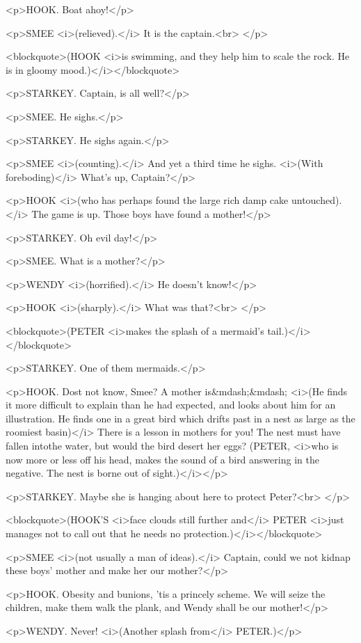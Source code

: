<p>HOOK. Boat ahoy!</p>

<p>SMEE <i>(relieved).</i> It is the captain.<br>
</p>

<blockquote>(HOOK <i>is swimming, and they help him to scale the
rock. He is in gloomy mood.)</i></blockquote>

<p>STARKEY. Captain, is all well?</p>

<p>SMEE. He sighs.</p>

<p>STARKEY. He sighs again.</p>

<p>SMEE <i>(counting).</i> And yet a third time he sighs. <i>(With
foreboding)</i> What's up, Captain?</p>

<p>HOOK <i>(who has perhaps found the large rich damp cake
untouched).</i> The game is up. Those boys have found a mother!</p>

<p>STARKEY. Oh evil day!</p>

<p>SMEE. What is a mother?</p>

<p>WENDY <i>(horrified).</i> He doesn't know!</p>

<p>HOOK <i>(sharply).</i> What was that?<br>
</p>

<blockquote>(PETER <i>makes the splash of a mermaid's
tail.)</i></blockquote>

<p>STARKEY. One of them mermaids.</p>

<p>HOOK. Dost not know, Smee? A mother is&mdash;&mdash; <i>(He finds
it more difficult to explain than he had expected, and looks about
him for an illustration. He finds one in a great bird which drifts
past in a nest as large as the roomiest basin)</i> There is a lesson
in mothers for you! The nest must have fallen intothe water, but
would the bird desert her eggs? (PETER, <i>who is now more or less
off his head, makes the sound of a bird answering in the negative.
The nest is borne out of sight.)</i></p>

<p>STARKEY. Maybe she is hanging about here to protect Peter?<br>
</p>

<blockquote>(HOOK'S <i>face clouds still further and</i> PETER
<i>just manages not to call out that he needs no
protection.)</i></blockquote>

<p>SMEE <i>(not usually a man of ideas).</i> Captain, could we not
kidnap these boys' mother and make her our mother?</p>

<p>HOOK. Obesity and bunions, 'tis a princely scheme. We will seize
the children, make them walk the plank, and Wendy shall be our
mother!</p>

<p>WENDY. Never! <i>(Another splash from</i> PETER.)</p>

